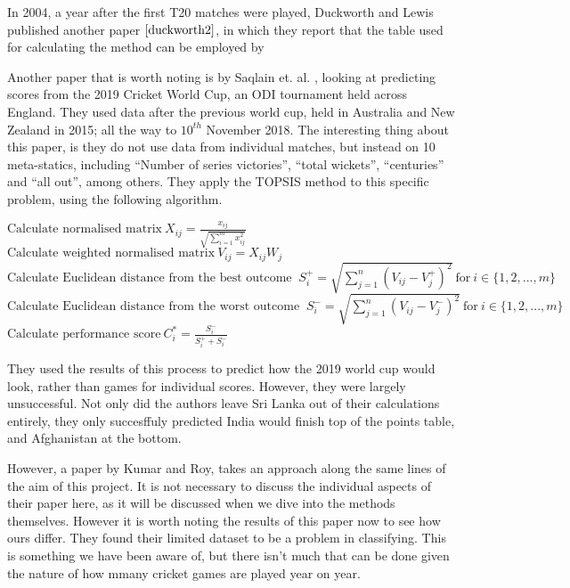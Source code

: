 In 2004, a year after the first T20 matches were played, Duckworth and Lewis published another paper $\cite{duckworth2}$, in which they report
that the table used for calculating the method can be employed by 

Another paper that is worth noting is by Saqlain et. al. \cite{saqlain}, looking at predicting scores from the 2019 Cricket World Cup, an ODI
tournament held across England. They used data after the previous world cup, held in Australia and New Zealand in 2015; all the way to $10^{th}$ November
2018. The interesting thing about this paper, is they do not use data from individual matches, but instead on 10 meta-statics, including 
``Number of series victories'', ``total wickets'', ``centuries'' and ``all out'', among others. They apply the TOPSIS method to this specific problem, using the 
following algorithm. \\

\begin{algorithmic}[1]
    \State $\text{Calculate normalised matrix} \ X_{ij} = \frac{x_{ij}}{\sqrt{\sum_{i=1}^mx_{ij}^2}}$
    \State $\text{Calculate weighted normalised matrix} \ V_{ij}=X_{ij}W_j$
    \State $\text{Calculate Euclidean distance from the best outcome } \ S_i^+ = \sqrt{\sum_{j=1}^n(V_{ij}-V_j^+)^2} \ \text{for} \ i \in \{1,2,...,m\}$
    \State $\text{Calculate Euclidean distance from the worst outcome } \ S_i^- = \sqrt{\sum_{j=1}^n(V_{ij}-V_j^-)^2} \ \text{for} \ i \in \{1,2,...,m\}$
    \State $\text{Calculate performance score} \ C_i^* = \frac{S_i^-}{S_i^+  + S_i^-}$
\end{algorithmic}

They used the results of this process to predict how the 2019 world cup would look, rather than games for individual scores. However, they were largely unsuccessful. 
Not only did the authors leave Sri Lanka out of their calculations entirely, they only succesffuly predicted India would finish top of the points table, and Afghanistan 
at the bottom. 

However, a paper by Kumar and Roy, \cite{kumar} takes an approach along the same lines of the aim of this project. It is not necessary to discuss the individual aspects
of their paper here, as it will be discussed when we dive into the methods themselves. However it is worth noting the results of this paper now to see how
ours differ. They found their limited dataset to be a problem in classifying. This is something we have been aware of, but there isn't much that can be done
given the nature of how mmany cricket games are played year on year. 